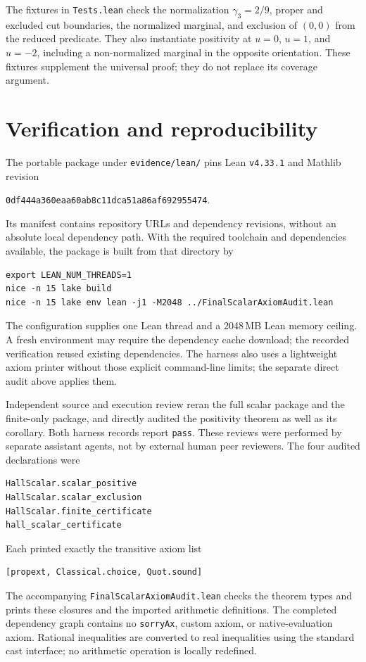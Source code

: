 \documentclass[11pt]{article}
\newcommand{\code}[1]{\texttt{\small #1}}
\begin{document}
The fixtures in \code{Tests.lean} check the normalization
$\gamma_3=2/9$, proper and excluded cut boundaries, the normalized
marginal, and exclusion of $(0,0)$ from the reduced predicate.
They also instantiate positivity at $u=0$, $u=1$, and $u=-2$,
including a non-normalized marginal in the opposite orientation.
These fixtures supplement the universal proof; they do not replace
its coverage argument.

\section{Verification and reproducibility}

The portable package under \code{evidence/lean/} pins Lean
\code{v4.33.1} and Mathlib revision
\begin{center}
\code{0df444a360eaa60ab8c11dca51a86af692955474}.
\end{center}
Its manifest contains repository URLs and dependency revisions, without
an absolute local dependency path. With the required toolchain and
dependencies available, the package is built from that directory by
\begin{Verbatim}[fontsize=\small]
export LEAN_NUM_THREADS=1
nice -n 15 lake build
nice -n 15 lake env lean -j1 -M2048 ../FinalScalarAxiomAudit.lean
\end{Verbatim}
The configuration supplies one Lean thread and a 2048\,MB Lean memory
ceiling. A fresh environment may require the dependency cache download;
the recorded verification reused existing dependencies.
The harness also uses a lightweight axiom printer without those explicit
command-line limits; the separate direct audit above applies them.

Independent source and execution review reran the full scalar package
and the finite-only package, and directly audited the positivity theorem
as well as its corollary. Both harness records report \code{pass}.
These reviews were performed by separate assistant agents, not by
external human peer reviewers.
The four audited declarations were
\begin{Verbatim}[fontsize=\small]
HallScalar.scalar_positive
HallScalar.scalar_exclusion
HallScalar.finite_certificate
hall_scalar_certificate
\end{Verbatim}
Each printed exactly the transitive axiom list
\begin{Verbatim}[fontsize=\small]
[propext, Classical.choice, Quot.sound]
\end{Verbatim}
The accompanying \code{FinalScalarAxiomAudit.lean} checks the theorem
types and prints these closures and the imported arithmetic definitions.
The completed dependency graph contains no \code{sorryAx}, custom
axiom, or native-evaluation axiom. Rational inequalities are converted
to real inequalities using the standard cast interface; no arithmetic
operation is locally redefined.
\end{document}
